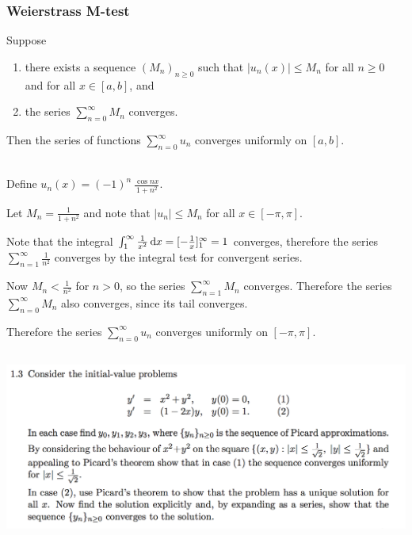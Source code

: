 \documentclass[12pt]{article}
\begin{document}
\subsubsection*{Weierstrass M-test}
Suppose
\begin{enumerate}
\item there exists a sequence $(M_n)_{n\geq 0}$ such that $|u_n(x)| \leq M_n$
  for all $n \geq 0$ and for all $x \in [a,b]$, and
\item the series $\sum_{n=0}^\infty M_n$ converges.
\end{enumerate}

Then the series of functions $\sum_{n=0}^\infty u_n$ converges uniformly on $[a,b]$.

~\\
Define $u_n(x) = (-1)^n ~ \frac{\cos nx}{1 + n^2}$.

Let $M_n = \frac{1}{1 + n^2}$ and note that $|u_n| \leq M_n$ for all
$x \in [-\pi,\pi]$.

Note that the integral
$\int_1^\infty \frac{1}{x^2} \dx = [-\frac{1}{x}]_1^\infty = 1$ converges,
therefore the series $\sum_{n=1}^\infty \frac{1}{n^2}$ converges by the
integral test for convergent series.

Now $M_n < \frac{1}{n^2}$ for $n > 0$, so the series $\sum_{n=1}^\infty M_n$
converges. Therefore the series $\sum_{n=0}^\infty M_n$ also converges, since
its tail converges.

Therefore the series $\sum_{n=0}^\infty u_n$ converges uniformly on
$[-\pi,\pi]$.

\newpage
\subsection*{}  %
\begin{mdframed}
\includegraphics[width=400pt]{img/differential-equations-a1-1-3.png}\\
\end{mdframed}
\end{document}
